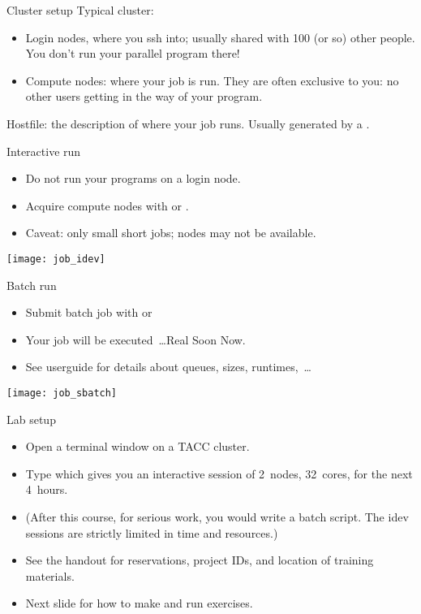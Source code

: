 \begin{numberedframe}{Cluster setup}
  \small
  Typical cluster:
  \begin{itemize}
  \item Login nodes, where you ssh into; usually shared with 100 (or
    so) other people. You don't run your parallel program there!
  \item Compute nodes: where your job is run. They are often exclusive
    to you: no other users getting in the way of your program.
  \end{itemize}
  Hostfile: the description of where your job runs. Usually generated
  by a .
\end{numberedframe}

\begin{numberedframe}{Interactive run}
  \begin{itemize}
  \item Do not run your programs on a login node.
  \item Acquire compute nodes with  or .
  \item Caveat: only small short jobs; nodes may not be available.
  \end{itemize}
  \texttt{[image: job\_idev]}
\end{numberedframe}

\begin{numberedframe}{Batch run}
  \begin{itemize}
  \item Submit batch job with  or 
  \item Your job will be executed~\ldots Real Soon Now.
  \item See userguide for details about queues, sizes, runtimes,~\ldots
  \end{itemize}
  \texttt{[image: job\_sbatch]}
\end{numberedframe}

\begin{tacc}
  \begin{numberedframe}{Lab setup}
    \begin{itemize}
    \item Open a terminal window on a TACC cluster.
    \item Type  which gives
      you an interactive session of 2~nodes, 32~cores, for the next
      4~hours.
    \item (After this course, for serious work, you would write a
      batch script. The idev sessions are strictly limited in time and
      resources.)
    \item See the handout for reservations, project IDs, and location of training materials.
    \item Next slide for how to make and run exercises.
    \end{itemize}
  \end{numberedframe}
\end{tacc}

